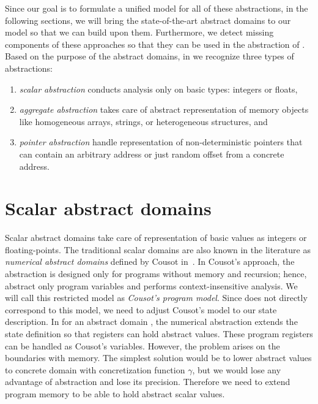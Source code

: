 Since our goal is to formulate a unified model for all of these abstractions,
in the following sections, we will bring the state-of-the-art abstract
domains to our \llvm model so that we can build upon them. Furthermore, we
detect missing components of these approaches so that they can be used in the
abstraction of \llvm. Based on the purpose of the abstract domains, in \llvm we
recognize three types of abstractions:
\begin{enumerate}
    \item \emph{scalar abstraction} conducts analysis only on basic types:
        integers or floats,
    \item \emph{aggregate abstraction} takes care of abstract representation of
        memory objects like homogeneous arrays, strings, or heterogeneous
        structures, and
    \item \emph{pointer abstraction} handle representation of non-deterministic
        pointers that can contain an arbitrary address or just random offset
        from a concrete address.
\end{enumerate}

\section{Scalar abstract domains}
\label{sec:domains}

Scalar abstract domains take care of representation of basic \llvm values as
integers or floating-points. The traditional scalar domains are also known in
the literature as \emph{numerical abstract domains} defined by Cousot
in~\cite{Cousot1977}. In Cousot's approach, the abstraction is designed only
for programs without memory and recursion; hence, abstract only program
variables and performs context-insensitive analysis. We will call this
restricted model as \emph{Cousot's program model}. Since \llvm does not
directly correspond to this model, we need to adjust Cousot's model to our
state description. In \llvm for an abstract domain \domain{}, the numerical
abstraction extends the state definition so that registers can hold abstract
values. These program registers can be handled as Cousot's variables. However,
the problem arises on the boundaries with memory.  The simplest solution would
be to lower abstract values to concrete domain with concretization function
$\gamma$, but we would lose any advantage of abstraction and lose its
precision.  Therefore we need to extend \llvm program memory to be able to hold
abstract scalar values.

